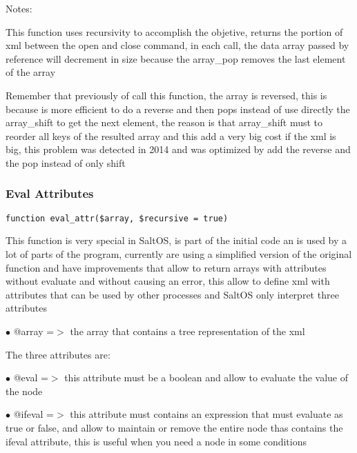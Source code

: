 \documentclass[a4paper]{article}
\begin{document}
Notes:

This function uses recursivity to accomplish the objetive, returns the portion
of xml between the open and close command, in each call, the data array passed
by reference will decrement in size because the array\_pop removes the last element
of the array

Remember that previously of call this function, the array is reversed, this is
because is more efficient to do a reverse and then pops instead of use directly
the array\_shift to get the next element, the reason is that array\_shift must to
reorder all keys of the resulted array and this add a very big cost if the xml
is big, this problem was detected in 2014 and was optimized by add the reverse
and the pop instead of only shift

\hypertarget{toc282}{}
\subsubsection{Eval Attributes}

\begin{lstlisting}
function eval_attr($array, $recursive = true)
\end{lstlisting}

This function is very special in SaltOS, is part of the initial code an
is used by a lot of parts of the program, currently are using a simplified
version of the original function and have improvements that allow to return
arrays with attributes without evaluate and without causing an error, this
allow to define xml with attributes that can be used by other processes and
SaltOS only interpret three attributes

\begin{compactitem}
\item[\color{myblue}$\bullet$] @array =$>$ the array that contains a tree representation of the xml
\end{compactitem}

The three attributes are:

\begin{compactitem}
\item[\color{myblue}$\bullet$] @eval =$>$ this attribute must be a boolean and allow to evaluate the value
of the node
\end{compactitem}

\begin{compactitem}
\item[\color{myblue}$\bullet$] @ifeval =$>$ this attribute must contains an expression that must evaluate as
true or false, and allow to maintain or remove the entire node thas contains
the ifeval attribute, this is useful when you need a node in some conditions
\end{compactitem}
\end{document}
